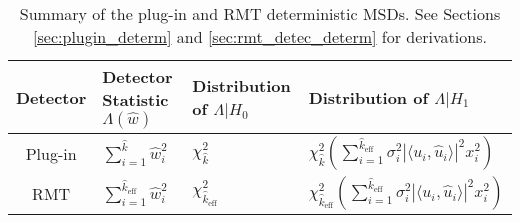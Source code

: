 \begin{table*}[ht!]
\centering
\begin{tabular}{clll}\toprule
 Detector & Detector Statistic $\Lambda(\widehat{w})$  & Distribution of $\Lambda|H_0$ & Distribution of $\Lambda|H_1$\\
\midrule
Plug-in & $\sum_{i=1}^{\widehat{k}}\widehat{w}_i^2$ & $\chi^2_{\widehat{k}}$ & $\chi^2_{\widehat{k}}\left(\sum_{i=1}^{\widehat{k}_{\text{eff}}}\sigma_i^2|\langle u_i,\widehat{u}_i\rangle|^2x_i^2\right)$\\
 RMT& $\sum_{i=1}^{\widehat{k}_{\text{eff}}}\widehat{w}_i^2$ & $\chi^2_{\widehat{k}_{\text{eff}}}$ & $\chi^2_{\widehat{k}_{\text{eff}}}\left(\sum_{i=1}^{\widehat{k}_{\text{eff}}}\sigma_i^2|\langle u_i,\widehat{u}_i\rangle|^2x_i^2\right)$\\
\bottomrule
\end{tabular}
\caption{Summary of the plug-in and RMT deterministic MSDs. See Sections \ref{sec:plugin_determ} and \ref{sec:rmt_detec_determ} for derivations.}\vskip-0.2cm
\label{table:summary_determ}
\vspace{-0.3in}
\end{table*}
